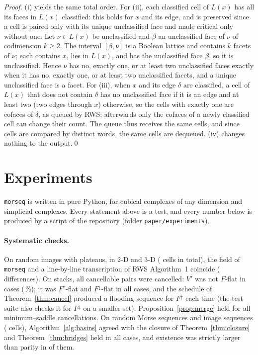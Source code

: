 \documentclass[runningheads]{llncs}
\newcommand{\Fup}{F^{\uparrow}}
\newcommand{\Fdown}{F^{\downarrow}}
\newcommand{\morseq}{\texttt{morseq}\xspace}
\begin{document}
\begin{proof}
(i) yields the same total order. For (ii), each classified cell of $L(x)$
has all its faces in $L(x)$ classified: this holds for $x$ and its edge,
and is preserved since a cell is paired only with its unique unclassified
face and made critical only without one. Let $\nu\in L(x)$ be unclassified
and $\beta$ an unclassified face of $\nu$ of codimension $k\ge2$. The
interval $[\beta,\nu]$ is a Boolean lattice and contains $k$ facets of
$\nu$; each contains $x$, lies in $L(x)$, and has the unclassified face
$\beta$, so it is unclassified. Hence $\nu$ has no, exactly one, or at least
two unclassified faces exactly when it has no, exactly one, or at least two
unclassified facets, and a unique unclassified face is a facet. For (iii),
when $x$ and its edge $\delta$ are classified, a cell of $L(x)$ that does
not contain $\delta$ has no unclassified face if it is an edge and at least
two (two edges through $x$) otherwise, so the cells with exactly one are
cofaces of $\delta$, as queued by RWS; afterwards only the cofaces of a
newly classified cell can change their count. The queue thus receives the
same cells, and since cells are compared by distinct words, the same cells
are dequeued. (iv) changes nothing to the output.\qed
\end{proof}

\section{Experiments}\label{sec:experiments}

\morseq is written in pure Python, for cubical complexes of any dimension
and simplicial complexes. Every statement above is a test, and every number
below is produced by a script of the repository (folder
\texttt{paper/experiments}).

\paragraph{Systematic checks.}
On \nRWSimages{} random images with plateaus, in 2-D and 3-D
(\nRWScells{} cells in total), the field of \morseq and a line-by-line
transcription of RWS Algorithm~1 coincide (\nRWSdiff{} differences). On
\nCancelStacks{} stacks, all \nCancelPairs{} cancellable pairs were cancelled:
$V'$ was not $F$-flat in \nCancelNotFlat{} cases (\nCancelNotFlatPct\,\%);
it was $\Fup$-flat and
$\Fdown$-flat in all cases, and the schedule of Theorem~\ref{thm:cancel}
produced a flooding sequence for $\Fup$ each time (the test suite also
checks it for $\Fdown$ on a smaller set).
Proposition~\ref{prop:merge} held for all \nMerges{} minimum--saddle
cancellations. On \nSeqs{} random Morse sequences and image sequences
(\nSeqCells{} cells), Algorithm~\ref{alg:basins} agreed with the closure of
Theorem~\ref{thm:closure} and Theorem~\ref{thm:bridges} held in all cases,
and existence was strictly larger than parity in \nStrict{} of them.
\end{document}

